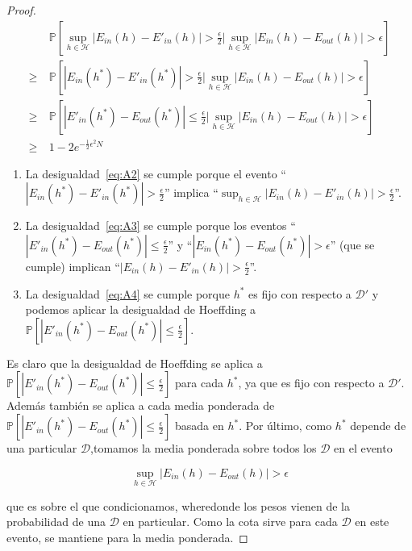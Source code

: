 \begin{proof}
    \begin{align}
          & \ \mathbb{P} \left[ \sup_{h \in \mathcal{H}} | E_{in}(h) - E'_{in}(h) | > \frac{\epsilon}{2}
            \Big\vert
            \sup_{h \in \mathcal{H}} | E_{in}(h) - E_{out}(h) | > \epsilon \right] \nonumber \\
    \geq & \ \mathbb{P} \left[ | E_{in}(h^*) - E'_{in}(h^*) | > \frac{\epsilon}{2} \Big\vert
            \sup_{h \in \mathcal{H}} | E_{in}(h) - E_{out}(h) | > \epsilon \right] \label{eq:A2} \\
    \geq & \ \mathbb{P} \left[ | E'_{in}(h^*) - E_{out}(h^*) | \leq \frac{\epsilon}{2}
            \Big\vert
            \sup_{h \in \mathcal{H}} | E_{in}(h) - E_{out}(h) | > \epsilon \right] \label{eq:A3} \\
    \geq & \ 1 - 2e^{-\frac{1}{2} \epsilon^2 N} \label{eq:A4}
    \end{align}


    \begin{enumerate}
        \item La desigualdad~\ref{eq:A2} se cumple porque el evento ``$| E_{in}(h^*) - E'_{in}(h^*) | > \frac{\epsilon}{2}$'' implica ``$\sup_{h \in \mathcal{H}} | E_{in}(h) - E'_{in}(h) | > \frac{\epsilon}{2}$''.
        \item La desigualdad~\ref{eq:A3} se cumple porque los eventos ``$| E'_{in}(h^*) - E_{out}(h^*) | \leq \frac{\epsilon}{2}$'' y ``$| E_{in}(h^*) - E_{out}(h^*) | > \epsilon$'' (que se cumple) implican ``$| E_{in}(h) - E'_{in}(h) | > \frac{\epsilon}{2}$''.
        \item La desigualdad~\ref{eq:A4} se cumple porque $h^*$ es fijo con respecto a $\mathcal{D}'$
        y podemos aplicar la desigualdad de Hoeffding a $\mathbb{P} \left[| E'_{in}(h^*) - E_{out}(h^*) |
        \leq \frac{\epsilon}{2} \right]$.
    \end{enumerate}
    Es claro que la desigualdad de Hoeffding se aplica a $\mathbb{P} \left[| E'_{in}(h^*) - E_{out}(h^*) |
    \leq \frac{\epsilon}{2} \right]$ para cada $h^*$, ya que es fijo con respecto a $\mathcal{D}'$.
    Además también se aplica a cada media ponderada de $\mathbb{P} \left[| E'_{in}(h^*) - E_{out}(h^*) | \leq \frac{\epsilon}{2} \right]$ basada en $h^*$. Por último, como $h^*$ depende de una particular
    $\mathcal{D}$,tomamos la media ponderada sobre todos los $\mathcal{D}$ en el evento

    \begin{displaymath}
        \sup_{h \in \mathcal{H}} | E_{in}(h) - E_{out}(h) | > \epsilon
    \end{displaymath}

    que es sobre el que condicionamos, wheredonde los pesos vienen de la probabilidad
    de una $\mathcal{D}$ en particular. Como la cota sirve para cada $\mathcal{D}$
    en este evento, se mantiene para la media ponderada.
  \end{proof}

